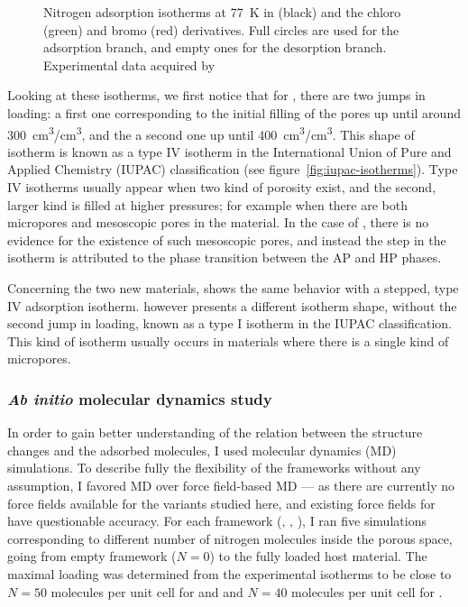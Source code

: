 \documentclass[thesis]{subfiles}
\begin{document}
\begin{figure}[ht]
    \centering
    
    \caption{Nitrogen adsorption isotherms at \SI{77}{K} in  (black) and
    the chloro (green) and bromo (red) derivatives. Full circles are used for
    the adsorption branch, and empty ones for the desorption branch.
    Experimental data acquired by\citeauthor{Chaplais2018}\cite{Chaplais2018}}
    \label{fig:zif8x:isotherms}
\end{figure}

Looking at these isotherms, we first notice that for , there are two jumps
in loading: a first one corresponding to the initial filling of the pores up
until around \SI{300}{cm^3/cm^3}, and the a second one up until
\SI{400}{cm^3/cm^3}. This shape of isotherm is known as a type IV isotherm in
the International Union of Pure and Applied Chemistry (IUPAC)
classification\cite{Sing1985} (see figure~\ref{fig:iupac-isotherms}). Type IV
isotherms usually appear when two kind of porosity exist, and the second, larger
kind is filled at higher pressures; for example when there are both micropores
and mesoscopic pores in the material. In the case of , there is no evidence
for the existence of such mesoscopic pores, and instead the step in the isotherm
is attributed to the phase transition between the AP and HP phases.

Concerning the two new materials, \ZIFCl shows the same behavior with a stepped,
type IV adsorption isotherm. \ZIFBr however presents a different isotherm shape,
without the second jump in loading, known as a type I isotherm in the IUPAC
classification. This kind of isotherm usually occurs in materials where there is
a single kind of micropores.

\subsubsection{\emph{Ab initio} molecular dynamics study}
\label{sec:zif8x:methods}

In order to gain better understanding of the relation between the structure
changes and the adsorbed molecules, I used molecular dynamics (MD) simulations.
To describe fully the flexibility of the frameworks without any assumption, I
favored \abinitio MD over force field-based MD --- as there are currently no
force fields available for the  variants studied here, and existing force
fields for  have questionable accuracy. For each framework (,
\ZIFCl, \ZIFBr), I ran five simulations corresponding to different number of
nitrogen molecules inside the porous space, going from empty framework ($N = 0$)
to the fully loaded host material. The maximal loading was determined from the
experimental isotherms to be close to $N = 50$ molecules per unit cell for
 and \ZIFCl and $N = 40$ molecules per unit cell for \ZIFBr.
\end{document}
